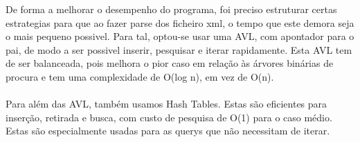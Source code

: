 \documentclass[a4paper, 10pt]{article}
\begin{document}
De forma a melhorar o desempenho do programa, foi preciso estruturar certas estrategias para que ao fazer parse dos ficheiro xml, o tempo que este demora seja o mais pequeno possivel. Para tal, optou-se usar uma AVL, com apontador para o pai, de modo a ser possivel inserir, pesquisar e iterar rapidamente. Esta AVL tem de ser balanceada, pois melhora o pior caso em relação às árvores binárias de procura e tem uma complexidade de O(log n), em vez de O(n).
\paragraph{ }
Para além das AVL, também usamos Hash Tables. Estas são eficientes para inserção, retirada e busca, com custo de pesquisa de O(1) para o caso médio. Estas são especialmente usadas para as querys que não necessitam de iterar.
\end{document}
